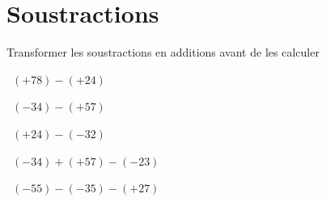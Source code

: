\section{Soustractions}

Transformer les soustractions en additions avant de les calculer
\begin{questions}
	\question[2]  $(+78) - (+24)$
	\fillwithdottedlines{2cm}
	\begin{solution}
		
	\end{solution}	
	
	
	\question[2]  $(-34) - (+57)$
	\fillwithdottedlines{2cm}
	\begin{solution}
		
	\end{solution}	

	\question[2]  $(+24) - (-32)$
	\fillwithdottedlines{2cm}
	\begin{solution}
		
	\end{solution}	


	\question[2]  $(-34) + (+57) - (-23) $
	\fillwithdottedlines{2cm}
	\begin{solution}
		
	\end{solution}

	\question[2]  $(-55) - (-35) - (+27) $
	\fillwithdottedlines{2cm}
	\begin{solution}
		
	\end{solution}
\end{questions}